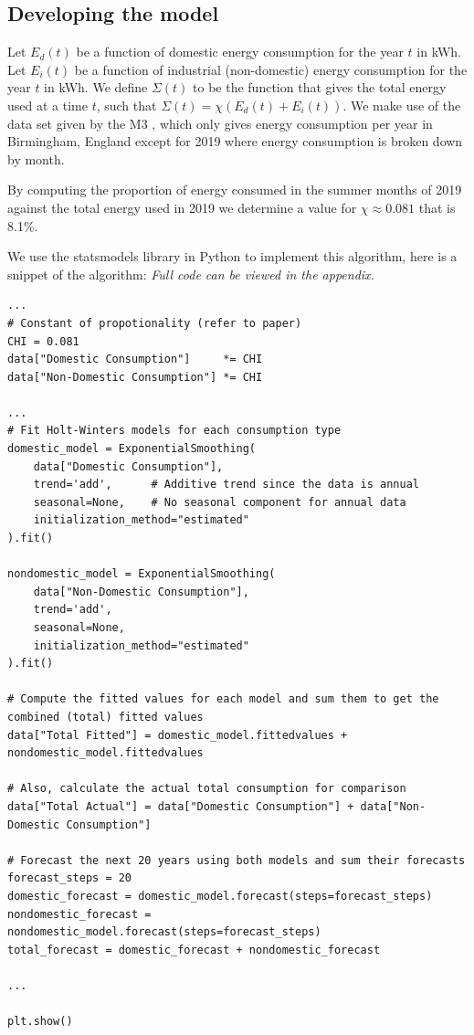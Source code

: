 \documentclass[11pt]{article}
\begin{document}
\subsection{Developing the model}

Let $E_d(t)$ be a function of domestic energy consumption for the year $t$ in kWh. Let $E_i(t)$ be a function of industrial
(non-domestic) energy consumption for the year $t$ in kWh. We define $\Sigma (t)$ to be the function that gives the total
energy used at a time $t$, such that $\Sigma(t) = \chi(E_d(t) + E_i(t))$. We make use of the data set given by the M3
\cite{m3}, which only gives energy consumption per year in Birmingham, England except for 2019 where energy consumption is
broken down by month.

By computing the proportion of energy consumed in the summer months of 2019 against the total energy used in 2019 we determine
a value for $\chi \approx 0.081$ that is 8.1\%.

We use the statsmodels library in Python to implement this algorithm, here is a snippet of the algorithm:
\textit{Full code can be viewed in the appendix.}

\begin{verbatim}
...
# Constant of propotionality (refer to paper)
CHI = 0.081
data["Domestic Consumption"]     *= CHI
data["Non-Domestic Consumption"] *= CHI

...
# Fit Holt-Winters models for each consumption type
domestic_model = ExponentialSmoothing(
    data["Domestic Consumption"],
    trend='add',      # Additive trend since the data is annual
    seasonal=None,    # No seasonal component for annual data
    initialization_method="estimated"
).fit()

nondomestic_model = ExponentialSmoothing(
    data["Non-Domestic Consumption"],
    trend='add',
    seasonal=None,
    initialization_method="estimated"
).fit()

# Compute the fitted values for each model and sum them to get the combined (total) fitted values
data["Total Fitted"] = domestic_model.fittedvalues + nondomestic_model.fittedvalues

# Also, calculate the actual total consumption for comparison
data["Total Actual"] = data["Domestic Consumption"] + data["Non-Domestic Consumption"]

# Forecast the next 20 years using both models and sum their forecasts
forecast_steps = 20
domestic_forecast = domestic_model.forecast(steps=forecast_steps)
nondomestic_forecast = nondomestic_model.forecast(steps=forecast_steps)
total_forecast = domestic_forecast + nondomestic_forecast

...

plt.show()
\end{verbatim}
\end{document}
